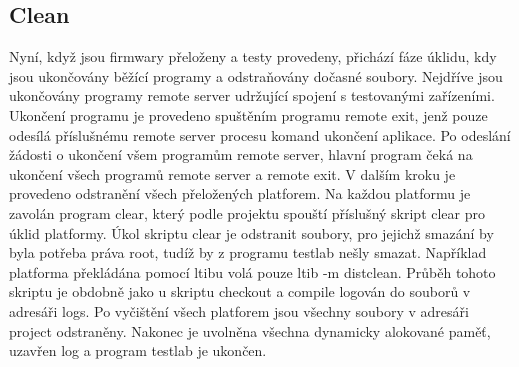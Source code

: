\subsection{Clean}
Nyní, když jsou firmwary přeloženy a testy provedeny, přichází fáze úklidu, kdy jsou ukončovány běžící programy a odstraňovány dočasné soubory. Nejdříve jsou ukončovány programy remote server udržující spojení s testovanými zařízeními. Ukončení programu je provedeno spuštěním programu remote exit, jenž pouze odesílá příslušnému remote server procesu komand ukončení aplikace. Po odeslání žádosti o ukončení všem programům remote server, hlavní program čeká na ukončení všech programů remote server a remote exit. V dalším kroku je provedeno odstranění všech přeložených platforem. Na každou platformu je zavolán program clear, který podle projektu spouští příslušný skript clear pro úklid platformy. Úkol skriptu clear je odstranit soubory, pro jejichž smazání by byla potřeba práva root, tudíž by z programu testlab nešly smazat. Například platforma překládána pomocí ltibu volá pouze ltib -m distclean. Průběh tohoto skriptu je obdobně jako u skriptu checkout a compile logován do souborů v adresáři logs. Po vyčištění všech platforem jsou všechny soubory v adresáři project odstraněny. Nakonec je uvolněna všechna dynamicky alokované paměť, uzavřen log a program testlab je ukončen.

\endinput

